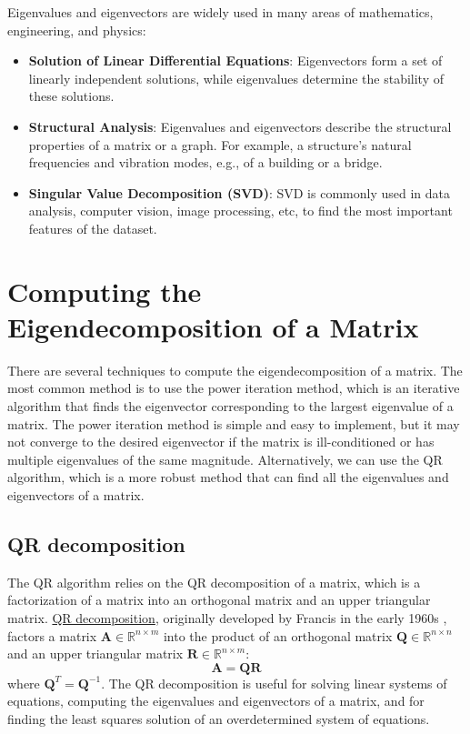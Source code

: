 \documentclass{article}[12pt]
\begin{document}
Eigenvalues and eigenvectors are widely used in many areas of mathematics, engineering, and physics:
\begin{itemize}
\item{\textbf{Solution of Linear Differential Equations}: Eigenvectors form a set of linearly independent solutions, while eigenvalues determine the stability of these solutions.}
\item{\textbf{Structural Analysis}: Eigenvalues and eigenvectors describe the structural properties of a matrix or a graph. For example, a structure's natural frequencies and vibration modes, e.g., of a building or a bridge.}
\item{\textbf{Singular Value Decomposition (SVD)}: SVD is commonly used in data analysis, computer vision, image processing, etc, to find the most important features of the dataset.}
\end{itemize}


\section{Computing the Eigendecomposition of a Matrix}
There are several techniques to compute the eigendecomposition of a matrix. 
The most common method is to use the power iteration method, which is an iterative algorithm that finds the eigenvector corresponding to the largest eigenvalue of a matrix.
The power iteration method is simple and easy to implement, but it may not converge to the desired eigenvector if the matrix is ill-conditioned or has multiple eigenvalues of the same magnitude.
Alternatively, we can use the QR algorithm, which is a more robust method that can find all the eigenvalues and eigenvectors of a matrix.

\subsection{QR decomposition}
The QR algorithm relies on the QR decomposition of a matrix, which is a factorization of a matrix into an orthogonal matrix and an upper triangular matrix.
\href{https://en.wikipedia.org/wiki/QR_decomposition}{QR decomposition}, originally developed by Francis in the early 1960s \cite{Francis-QR-1961, Francis-QR-1962}, factors a matrix $\mathbf{A}\in\mathbb{R}^{n\times{m}}$ 
into the product of an orthogonal matrix $\mathbf{Q}\in\mathbb{R}^{n\times{n}}$ and 
an upper triangular matrix $\mathbf{R}\in\mathbb{R}^{n\times{m}}$:
\begin{equation}
\mathbf{A} = \mathbf{Q}\mathbf{R}
\end{equation}
where $\mathbf{Q}^{T} = \mathbf{Q}^{-1}$. 
The QR decomposition is useful for solving linear systems of equations, computing the eigenvalues and eigenvectors of a matrix, and for finding the least squares solution of an overdetermined system of equations.
\end{document}
